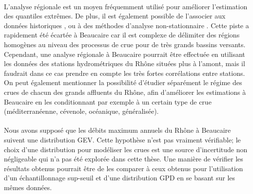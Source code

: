 		\paragraph{} L'analyse régionale est un moyen fréquemment utilisé pour améliorer l'estimation des quantiles extrêmes. De plus, il est également possible de l'associer aux données historiques \citep{gaume_bayesian_2010}, ou à des méthodes d'analyse non-stationnaire \citep{han_incorporating_2022}. Cette piste a rapidement été écartée à Beaucaire car il est complexe de délimiter des régions homogènes au niveau des processus de crue pour de très grands bassins versants. Cependant, une analyse régionale à Beaucaire pourrait être effectuée en utilisant les données des stations hydrométriques du Rhône situées plus à l'amont, mais il faudrait dans ce cas prendre en compte les très fortes corrélations entre stations. On peut également mentionner la possibilité d'étudier séparément le régime des crues de chacun des grands affluents du Rhône, afin d'améliorer les estimations à Beaucaire en les conditionnant par exemple à un certain type de crue (méditerranéenne, cévenole, océanique, généralisée).
	
		\paragraph{} Nous avons supposé que les débits maximum annuels du Rhône à Beaucaire suivent une distribution GEV. Cette hypothèse n'est pas vraiment vérifiable; le choix d'une distribution pour modéliser les crues est une source d'incertitude non négligeable qui n'a pas été explorée dans cette thèse. Une manière de vérifier les résultats obtenus pourrait être de les comparer à ceux obtenus pour l'utilisation d'un échantillonnage sup-seuil et d'une distribution GPD en se basant sur les mêmes données. 
		
